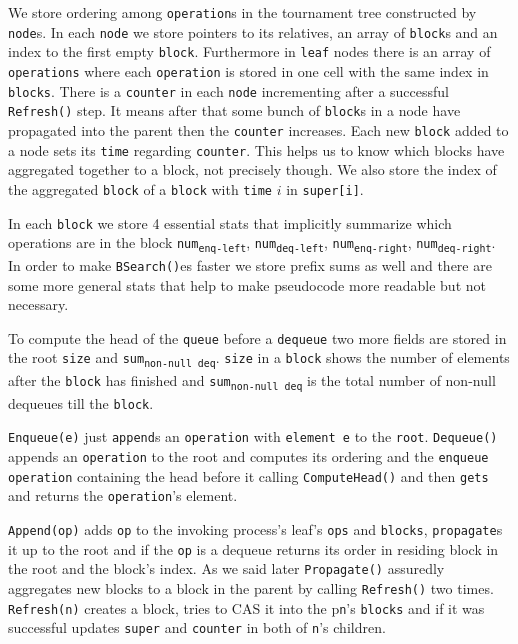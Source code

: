 \documentclass[10pt]{article}
\theoremstyle{definition}
\begin{document}
We store ordering among \texttt{operation}s in the tournament tree constructed by \texttt{node}s. In each \texttt{node} we store pointers to its relatives, an array of \texttt{block}s and an index to the first empty \texttt{block}. Furthermore in \texttt{leaf} nodes there is an array of \texttt{operations} where each \texttt{operation} is stored in one cell with the same index in \texttt{blocks}. There is a \texttt{counter} in each \texttt{node} incrementing after a successful \texttt{Refresh()} step. It means after that some bunch of \texttt{block}s in a node have propagated into the parent then the \texttt{counter} increases. Each new \texttt{block} added to a node sets its \texttt{time} regarding \texttt{counter}. This helps us to know which blocks have aggregated together to a block, not precisely though. We also store the index of the aggregated \texttt{block} of a \texttt{block} with \texttt{time} $i$ in \texttt{super[i]}. 

In each \texttt{block} we store 4 essential stats that implicitly summarize which operations are in the block \texttt{num\textsubscript{enq-left}}, \texttt{num\textsubscript{deq-left}}, \texttt{num\textsubscript{enq-right}}, \texttt{num\textsubscript{deq-right}}. In order to make \texttt{BSearch()}es faster we store prefix sums as well and there are some more general stats that help to make pseudocode more readable but not necessary.

To compute the head of the \texttt{queue} before a \texttt{dequeue} two more fields are stored in the root \texttt{size} and \texttt{sum\textsubscript{non-null deq}}. \texttt{size} in a \texttt{block} shows the number of elements after the \texttt{block} has finished and \texttt{sum\textsubscript{non-null deq}} is the total number of non-null dequeues till the \texttt{block}.

\texttt{Enqueue(e)} just \texttt{append}s an \texttt{operation} with \texttt{element e} to the \texttt{root}. \texttt{Dequeue()} appends an \texttt{operation} to the root and computes its ordering and the \texttt{enqueue operation} containing the head before it calling \texttt{ComputeHead()} and then \texttt{gets} and returns the \texttt{operation}'s element.

\texttt{Append(op)} adds \texttt{op} to the invoking process's leaf's \texttt{ops} and \texttt{blocks}, \texttt{propagate}s it up to the root and if the \texttt{op} is a dequeue returns its order in residing block in the root and the block's index. As we said later \texttt{Propagate()} assuredly aggregates new blocks to a block in the parent by calling \texttt{Refresh()} two times. \texttt{Refresh(n)} creates a block, tries to CAS it into the p\texttt{n}'s \texttt{blocks} and if it was successful updates \texttt{super} and \texttt{counter} in both of \texttt{n}'s children.
\end{document}
